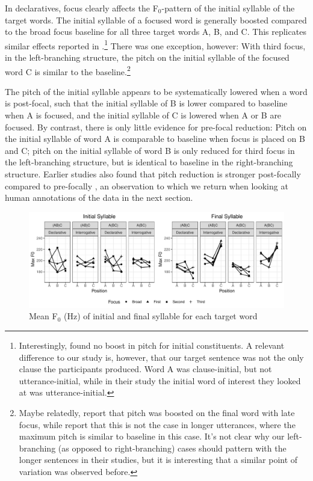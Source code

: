 \documentclass[preprint,review,12pt,authoryear,times]{elsarticle}
\begin{document}
In declaratives, focus clearly affects the F$_0$-pattern of the initial syllable of the target words. The initial syllable of a focused word is generally boosted compared to the broad focus baseline for all three target words A, B, and C.  This replicates similar effects reported in \citep[][i.a.]{breenetal10}.\footnote{Interestingly, \citet{eady86} found no boost in pitch for initial constituents. A relevant difference to our study is, however, that our target sentence was not the only clause the participants produced. Word A was clause-initial, but not utterance-initial, while in their study the initial word of interest they looked at was utterance-initial.} There was one exception, however: With third focus, in the left-branching structure, the pitch on the initial syllable of the focused word C is similar to the baseline.\footnote{Maybe relatedly, \citet{eady86} report that pitch was boosted on the final word with late focus, while \citet{coope85} report that this is not the case in longer utterances, where the maximum pitch is similar to baseline in this case. It's not clear why our left-branching (as opposed to right-branching) cases should pattern with the longer sentences in their studies, but it is interesting that a similar point of variation was observed before.}

The pitch of the initial syllable appears to be systematically lowered when a word is post-focal, such that the initial syllable of B is lower compared to baseline when A is focused, and the initial syllable of C is lowered when A or B are focused. By contrast, there is only little evidence for pre-focal reduction: Pitch on the initial syllable of word A is comparable to baseline when focus is placed on B and C; pitch on the initial syllable of word B is only reduced for third focus in the left-branching structure, but is identical to baseline in the right-branching structure. Earlier studies also found that pitch reduction is stronger post-focally compared to pre-focally \citet{eady86,eady86dual}, an observation to which we return when looking at human annotations of the data in the next section.


\begin{figure}[ht!]
	\begin{center}
		\includegraphics[width=5.4in]{Figures/Max_F0.pdf}
		\caption{Mean F$_0$ (Hz) of initial and final syllable for each target word}
		\label{figurePitch}
	\end{center}
\end{figure}
\end{document}
